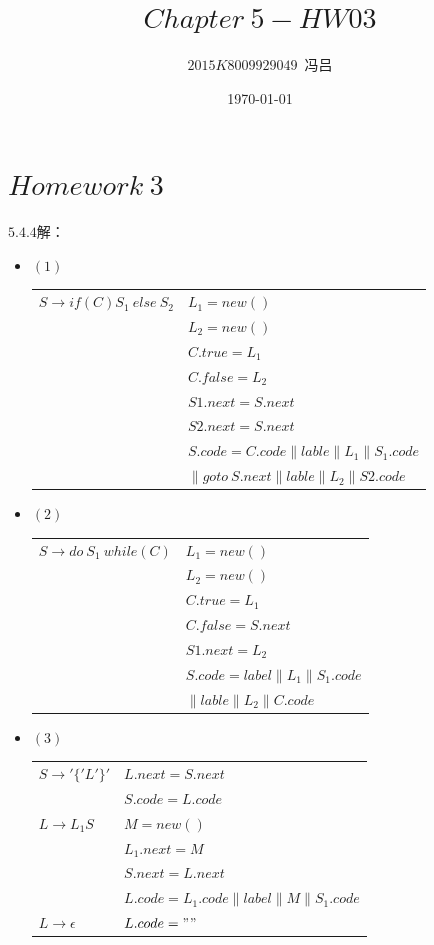 \documentclass[UTF8,noindent]{ctexart}
\title{$Chapter\ 5-HW03$}
\author{$2015K8009929049$\ 冯吕}
\date{\today}
\begin{document}
\maketitle
{}
\section*{$Homework\ 3$}

$5.4.4$解：
\begin{itemize}
  \item $(1)$
  \begin{center}
	\begin{tabular}{l l }
	  $S\rightarrow if (C) S_1\ else\ S_2$ & $L_1=new()$\\
	  & $L_2=new()$\\
	  & $C.true = L_1$\\
	& $C.false = L_2$\\
	& $S1.next = S.next$\\
	& $S2.next = S.next$\\
	& $S.code = C.code \parallel lable \parallel L_1\parallel S_1.code$\\
	& $\parallel goto\ S.next\parallel lable \parallel L_2\parallel S2.code$
	\end{tabular}
  \end{center}

\item $(2)$
  \begin{center}
	\begin{tabular}{l l }
	  $S\rightarrow do\  S_1\ while(C)$ & $L_1=new()$\\
	  & $L_2=new()$\\
	  & $C.true = L_1$\\
	  & $C.false = S.next$\\
	& $S1.next = L_2$\\
	& $S.code = label\parallel L_1 \parallel S_1.code$\\
	& $\parallel lable \parallel L_2\parallel C.code$
	\end{tabular}
  \end{center}
\item $(3)$
  \begin{center}
	\begin{tabular}{ll}
	  $S\rightarrow '\{'L'\}'$ & $L.next = S.next$\\
	  & $S.code = L.code$\\
	  $L\rightarrow L_1 S$ & $M= new()$\\
	  &   $L_1.next = M$\\
	  & $S.next = L.next$\\
	  & $L.code = L_1.code \parallel label \parallel M\parallel S_1.code$\\
	  $L\rightarrow \epsilon$ & $L.code = ""$
	\end{tabular}
  \end{center}
\end{itemize}
\end{document}
